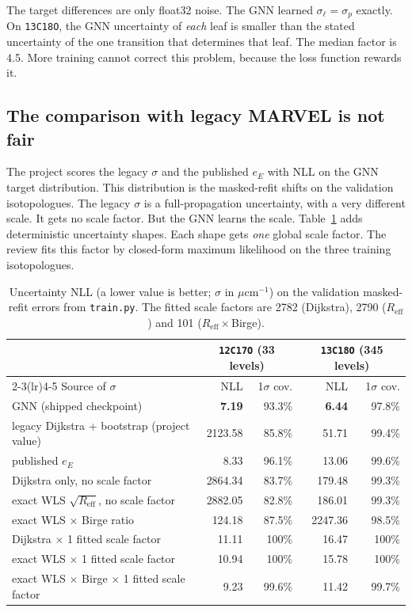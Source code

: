 \documentclass[11pt,a4paper]{article}
\newcommand{\code}[1]{\texttt{#1}}
\newcommand{\ucm}{\ensuremath{\mu\mathrm{cm}^{-1}}}
\begin{document}
\noindent The target differences are only float32 noise. The GNN learned
$\sigma_\ell = \sigma_p$ exactly. On \code{13C18O}, the GNN uncertainty of \emph{each}
leaf is smaller than the stated uncertainty of the one transition that determines that
leaf. The median factor is 4.5. More training cannot correct this problem, because
the loss function rewards it.

\subsection{The comparison with legacy MARVEL is not fair}
The project scores the legacy $\sigma$ and the published $e_E$ with NLL on the GNN
target distribution. This distribution is the masked-refit shifts on the validation
isotopologues. The legacy $\sigma$ is a full-propagation uncertainty, with a very
different scale. It gets no scale factor. But the GNN learns the scale.
Table~\ref{tab:unc} adds deterministic uncertainty shapes. Each shape gets \emph{one}
global scale factor. The review fits this factor by closed-form maximum likelihood on
the three training isotopologues.

\begin{table}[h]
\centering\small
\begin{tabular}{@{}lrrrr@{}}
\toprule
& \multicolumn{2}{c}{\code{12C17O} (33 levels)} & \multicolumn{2}{c}{\code{13C18O} (345 levels)} \\
\cmidrule(lr){2-3}\cmidrule(lr){4-5}
Source of $\sigma$ & NLL & 1$\sigma$ cov. & NLL & 1$\sigma$ cov. \\
\midrule
GNN (shipped checkpoint) & \textbf{7.19} & 93.3\% & \textbf{6.44} & 97.8\% \\
legacy Dijkstra + bootstrap (project value) & 2123.58 & 85.8\% & 51.71 & 99.4\% \\
published $e_E$ & 8.33 & 96.1\% & 13.06 & 99.6\% \\
\midrule
Dijkstra only, no scale factor & 2864.34 & 83.7\% & 179.48 & 99.3\% \\
exact WLS $\sqrt{R_{\mathrm{eff}}}$, no scale factor & 2882.05 & 82.8\% & 186.01 & 99.3\% \\
exact WLS $\times$ Birge ratio & 124.18 & 87.5\% & 2247.36 & 98.5\% \\
\midrule
Dijkstra $\times$ 1 fitted scale factor & 11.11 & 100\% & 16.47 & 100\% \\
exact WLS $\times$ 1 fitted scale factor & 10.94 & 100\% & 15.78 & 100\% \\
exact WLS $\times$ Birge $\times$ 1 fitted scale factor & 9.23 & 99.6\% & 11.42 & 99.7\% \\
\bottomrule
\end{tabular}
\caption{Uncertainty NLL (a lower value is better; $\sigma$ in \ucm) on the validation
masked-refit errors from \code{train.py}. The fitted scale factors are 2782
(Dijkstra), 2790 ($R_{\mathrm{eff}}$) and 101 ($R_{\mathrm{eff}}\times$Birge).}
\label{tab:unc}
\end{table}
\end{document}
